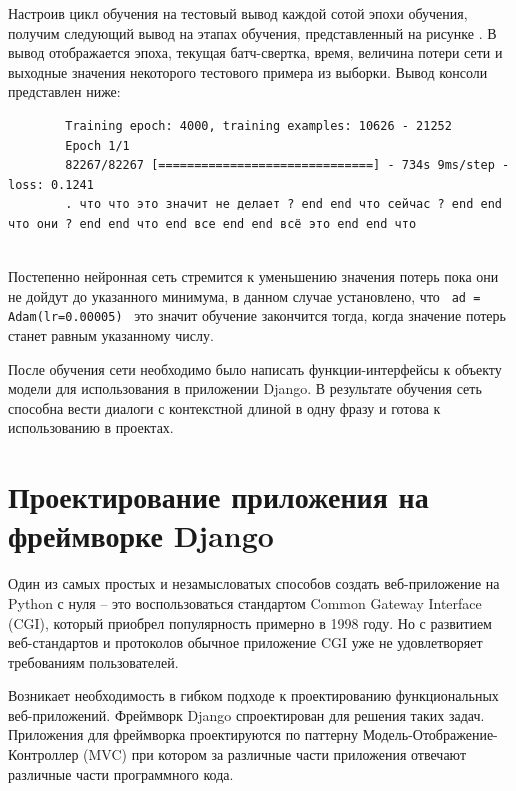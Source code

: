 Настроив цикл обучения на тестовый вывод каждой сотой эпохи обучения, получим следующий вывод на этапах обучения, представленный на рисунке . В вывод отображается эпоха, текущая батч-свертка, время, величина потери сети и выходные значения некоторого тестового примера из выборки. Вывод консоли представлен ниже:


\begin{minipage}{0.9\textwidth}
   
        \begin{verbatim}
        Training epoch: 4000, training examples: 10626 - 21252
        Epoch 1/1
        82267/82267 [==============================] - 734s 9ms/step - loss: 0.1241
        . что что это значит не делает ? end end что сейчас ? end end что они ? end end что end все end end всё это end end что 
        \end{verbatim}
    
\end{minipage}\\[1.5pt]


Постепенно нейронная сеть стремится к уменьшению значения потерь пока они не дойдут до указанного минимума, в данном случае установлено, что \texttt{ ad = Adam(lr=0.00005) } это значит обучение закончится тогда, когда значение потерь станет равным указанному числу. 

После обучения сети необходимо было написать функции-интерфейсы к объекту модели для использования в приложении Django. В результате обучения сеть способна вести диалоги с контекстной длиной в одну фразу и готова к использованию в проектах. 

\section{Проектирование приложения на фреймворке Django}
Один из самых простых и незамысловатых способов создать веб-приложение на Python с нуля – это воспользоваться стандартом Common Gateway Interface (CGI), который приобрел популярность примерно в 1998 году. Но с развитием веб-стандартов и протоколов обычное приложение CGI уже не удовлетворяет требованиям пользователей. 

Возникает необходимость в гибком подходе к проектированию функциональных веб-приложений. Фреймворк Django спроектирован для решения таких задач. Приложения для фреймворка проектируются по паттерну Модель-Отображение-Контроллер (MVC) при котором за различные части приложения отвечают различные части программного кода. 

